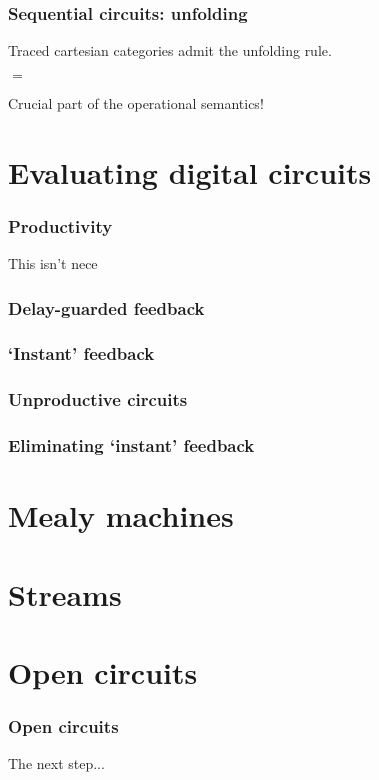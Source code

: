 \documentclass[aspectratio=169]{beamer}
\begin{document}
    \begin{frame}
        \frametitle{Sequential circuits: unfolding}

        \pause

        Traced cartesian categories admit the \alert{unfolding} rule.

        \pause
        \vspace{1em}

        \begin{center}
            \quad$=$\quad
        \end{center}

        \pause

        Crucial part of the operational semantics!
    \end{frame}

    \section{Evaluating digital circuits}

    \begin{frame}
        \frametitle{Productivity}
    
        

        This isn't nece
    
    \end{frame}

    \begin{frame}
        \frametitle{Delay-guarded feedback}
    
        
    
    \end{frame}

    \begin{frame}
        \frametitle{`Instant' feedback}
    
        
    
    \end{frame}

    \begin{frame}
        \frametitle{Unproductive circuits}
    
        
    
    \end{frame}

    \begin{frame}
        \frametitle{Eliminating `instant' feedback}
    
        
    
    \end{frame}


    \section{Mealy machines}


    \section{Streams}


    \section{Open circuits}

    \begin{frame}
        \frametitle{Open circuits}
    
        The next step...
    
    \end{frame}
\end{document}
